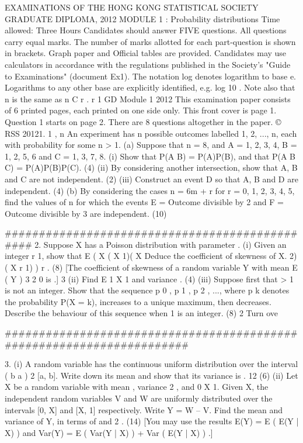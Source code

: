 EXAMINATIONS OF THE HONG KONG STATISTICAL SOCIETY
GRADUATE DIPLOMA, 2012
MODULE 1 : Probability distributions
Time allowed: Three Hours
Candidates should answer FIVE questions.
All questions carry equal marks.
The number of marks allotted for each part-question is shown in brackets.
Graph paper and Official tables are provided.
Candidates may use calculators in accordance with the regulations published in
the Society's "Guide to Examinations" (document Ex1).
The notation log denotes logarithm to base e.
Logarithms to any other base are explicitly identified, e.g. log 10 .
Note also that
n
is the same as n C r .
r
1
GD Module 1 2012
This examination paper consists of 6 printed pages, each printed on one side only.
This front cover is page 1.
Question 1 starts on page 2.
There are 8 questions altogether in the paper.
© RSS 20121.
1
,
n
An experiment has n possible outcomes labelled 1, 2, ..., n, each with probability
for some n > 1.
(a)
Suppose that n = 8, and A = {1, 2, 3, 4}, B = {1, 2, 5, 6} and C = {1, 3, 7, 8}.
(i) Show that P(A
B) = P(A)P(B), and that P(A
B
C) = P(A)P(B)P(C).
(4)
(ii) By considering another intersection, show that A, B and C are not
independent.
(2)
(iii) Construct an event D so that A, B and D are independent.
(4)
(b)
By considering the cases n = 6m + r for r = 0, 1, 2, 3, 4, 5, find the values of n
for which the events
E = {Outcome divisible by 2} and F = {Outcome divisible by 3}
are independent.
(10)

###############################################
2.
Suppose X has a Poisson distribution with parameter .
(i)
Given an integer r
1, show that E ( X ( X 1)( X
Deduce the coefficient of skewness of X.
2)
( X r 1) )
r
.
(8)
[The coefficient of skewness of a random variable Y with mean
E ( Y
) 3
2
0 is
.]
3
(ii)
Find E
1
X 1
and variance
.
(4)
(iii)
Suppose first that > 1 is not an integer. Show that the sequence p 0 , p 1 , p 2 , ...,
where p k denotes the probability P(X = k), increases to a unique maximum,
then decreases. Describe the behaviour of this sequence when
1 is an
integer.
(8)
2
Turn ove

######################################################################

3.
(i) A random variable has the continuous uniform distribution over the interval
( b a ) 2
[a, b]. Write down its mean and show that its variance is
.
12
(6)
(ii) Let X be a random variable with mean , variance 2 , and 0 X 1. Given X,
the independent random variables V and W are uniformly distributed over the
intervals [0, X] and [X, 1] respectively. Write Y = W – V. Find the mean and
variance of Y, in terms of and 2 .
(14)
[You may use the results
E(Y) = E ( E(Y | X) ) and Var(Y) = E ( Var(Y | X) ) + Var ( E(Y | X) ) .]

